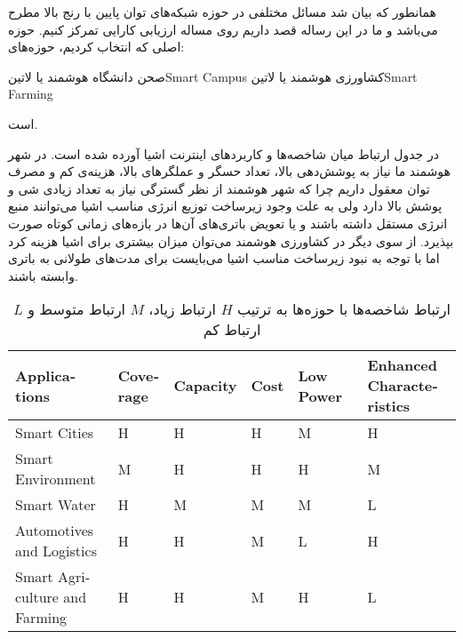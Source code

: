 

همانطور که بیان شد مسائل مختلفی در حوزه شبکه‌های توان پایین با رنج بالا مطرح می‌باشد و ما در این رساله قصد داریم روی مساله ارزیابی کارایی تمرکز کنیم.
حوزه اصلی که انتخاب کردیم، حوزه‌های:

 صحن دانشگاه هوشمند یا ‌لاتین{Smart Campus}
 کشاورزی هوشمند یا ‌لاتین{Smart Farming}

است.

در جدول  ارتباط میان شاخصه‌ها و کاربردهای اینترنت اشیا آورده شده است.
در شهر هوشمند ما نیاز به پوشش‌دهی بالا، تعداد حسگر و عملگرهای بالا، هزینه‌ی کم و مصرف توان معقول داریم چرا
که شهر هوشمند از نظر گسترگی نیاز به تعداد زیادی شی و پوشش بالا دارد ولی به علت وجود زیرساخت توزیع انرژی مناسب
اشیا می‌توانند منبع انرژی مستقل داشته باشند و یا تعویض باتری‌های آن‌ها در بازه‌های زمانی کوتاه صورت بپذیرد.
از سوی دیگر در کشاورزی هوشمند می‌توان میزان بیشتری برای اشیا هزینه کرد اما با توجه به نبود زیرساخت مناسب
اشیا می‌بایست برای مدت‌های طولانی به باتری وابسته باشند.

\begin{table}
\label{جدول: شاخصه‌ها و کاربردها}
\caption{ارتباط شاخصه‌ها با حوزه‌ها به ترتیب $H$ ارتباط زیاد، $M$ ارتباط متوسط و $L$ ارتباط کم }
\begin{latin}\begin{tabularx}
  {\textwidth}
  {|*{6}{X|}}
  \toprule
  Applications &
  Coverage &
  Capacity &
  Cost &
  Low Power &
  Enhanced Characteristics \\
  \midrule
  Smart Cities &
  H &
  H &
  H &
  M &
  H \\
  \midrule
  Smart Environment &
  M &
  H &
  H &
  H &
  M \\
  \midrule
  Smart Water &
  H &
  M &
  M &
  M &
  L \\
  \midrule
  Automotives and Logistics &
  H &
  H &
  M &
  L &
  H \\
  \midrule
  Smart Agriculture and Farming &
  H &
  H &
  M &
  H &
  L \\
  \bottomrule
\end{tabularx}\end{latin}
\end{table}



